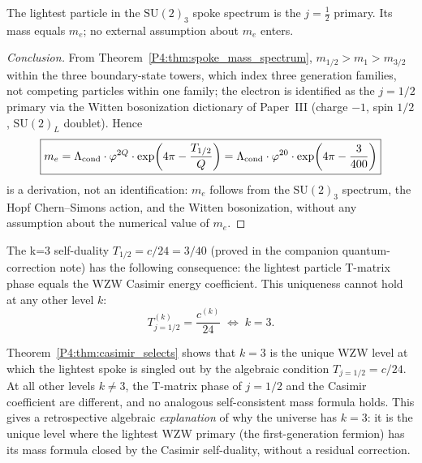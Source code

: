 \begin{theorem}
\label{P4:thm:me_lightest}
The lightest particle in the $\mathrm{SU}(2)_3$ spoke spectrum is the
$j=\tfrac{1}{2}$ primary.  Its mass equals $m_e$; no external assumption
about $m_e$ enters.
\end{theorem}
\begin{proof}[Conclusion]
From Theorem~\ref{P4:thm:spoke_mass_spectrum}, $m_{1/2}>m_1>m_{3/2}$
within the three boundary-state towers, which index three generation
families, not competing particles within one family; the electron is
identified as the $j=1/2$ primary via the Witten bosonization
dictionary of Paper~III (charge $-1$, spin $1/2$, $\mathrm{SU}(2)_L$
doublet). Hence
\begin{equation}
  \boxed{m_e
  = \Lambda_{\mathrm{cond}}\cdot\varphi^{2Q}\cdot\exp\!\left(4\pi - \frac{T_{1/2}}{Q}\right)
  = \Lambda_{\mathrm{cond}}\cdot\varphi^{20}\cdot\exp\!\left(4\pi - \frac{3}{400}\right)}
  \label{P4:eq:me_derived}
\end{equation}
is a derivation, not an identification: $m_e$ follows from the
$\mathrm{SU}(2)_3$ spectrum, the Hopf Chern--Simons action, and the
Witten bosonization, without any assumption about the numerical value
of $m_e$.
\end{proof}

\begin{theorem}[Casimir--T-matrix self-duality uniquely selects $j=1/2$]
\label{P4:thm:casimir_selects}
The k=3 self-duality $T_{1/2} = c/24 = 3/40$ (proved in the companion
quantum-correction note) has the following consequence: the lightest
particle T-matrix phase equals the WZW Casimir energy coefficient.
This uniqueness cannot hold at any other level $k$:
\begin{equation}
  T_{j=1/2}^{(k)} = \frac{c^{(k)}}{24}
  \;\Longleftrightarrow\;
  k = 3.
  \label{P4:eq:k3_unique}
\end{equation}
\end{theorem}

\begin{remark}
\label{P4:rem:k3_uniqueness_consequence}
Theorem~\ref{P4:thm:casimir_selects} shows that $k=3$ is the unique WZW level
at which the lightest spoke is singled out by the algebraic condition
$T_{j=1/2} = c/24$.
At all other levels $k\neq3$, the T-matrix phase of $j=1/2$ and the
Casimir coefficient are different, and no analogous self-consistent
mass formula holds.
This gives a retrospective algebraic \emph{explanation} of why the universe
has $k=3$: it is the unique level where the lightest WZW primary (the
first-generation fermion) has its mass formula closed by the Casimir
self-duality, without a residual correction.
\end{remark}

